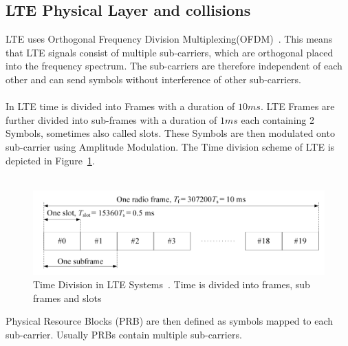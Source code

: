 \documentclass[conference]{IEEEtran}
\begin{document}
\subsection{LTE Physical Layer and collisions} \label{collision}
LTE uses Orthogonal Frequency Division Multiplexing(OFDM)~\cite{ETSI_TS_138_211}.
This means that LTE signals consist of multiple sub-carriers, which are orthogonal placed into the frequency spectrum.
The sub-carriers are therefore independent of each other and can send symbols without interference of other sub-carriers.\\\\
In LTE time is divided into Frames with a duration of $10 ms$.
LTE Frames are further divided into sub-frames with a duration of $1 ms$ each containing 2 Symbols, sometimes also called slots.
These Symbols are then modulated onto sub-carrier using Amplitude Modulation.
The Time division scheme of LTE is depicted in Figure~\ref{fig:time}.\\\\
\begin{figure}
    \centering
    \includegraphics[width= \columnwidth]{../Figures/LTE_Frame2}
    \caption{Time Division in LTE Systems~\cite{ETSI_TS_138_211}. Time is divided into frames, sub frames and slots}
    \label{fig:time}
\end{figure}
Physical Resource Blocks (PRB) are then defined as symbols mapped to each sub-carrier.
Usually PRBs contain multiple sub-carriers.
\end{document}
